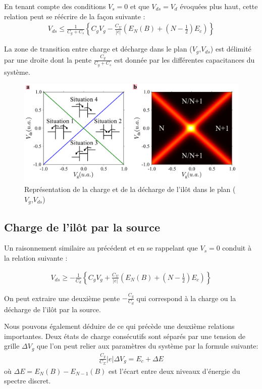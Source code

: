En tenant compte des conditions $V_s= 0$ et que $V_{ds} = V_d$ évoquées plus haut, cette relation peut se réécrire de la façon suivante :
\begin{eqnarray}
V_{ds} \leq \frac{1}{C_g + C_s} \left\lbrace C_gV_g - \frac{C_{\Sigma}}{|e|}\left(E_N(B) + (N-\frac{1}{2})E_c \right) \right\rbrace 
\end{eqnarray}

La zone de transition entre charge et décharge dans le plan ($V_g$,$V_{ds}$) est délimité par une droite dont la pente $\frac{C_g}{C_g + C_s}$ est donnée par les différentes capacitances du système.


\begin{figure}
\includegraphics[scale=0.5]{Theorie/Transport/figure3/figure3.pdf} 
\caption{Représentation de la charge et de la décharge de l'il\^ot dans le plan ($V_g$,$V_{ds}$)}
\label{charge_discharge}
\end{figure}



\subsection{Charge de l'il\^ot par la source}
Un raisonnement similaire au précédent et en se rappelant que $V_s = 0$ conduit à la relation suivante :

\begin{eqnarray}
V_{ds} \geq -\frac{1}{C_d} \left\lbrace C_gV_g + \frac{C_{\Sigma}}{|e|}\left( E_N(B) + (N-\frac{1}{2})E_c \right) \right\rbrace
\end{eqnarray}


On peut extraire une deuxième pente $-\frac{C_g}{C_d}$ qui correspond à la charge ou la décharge de l'il\^ot par la source.

Nous pouvons également déduire de ce qui précède une deuxième relations importantes. Deux états de charge consécutifs sont séparés par une tension de grille $\Delta V_g$ que l'on peut relier aux paramètres du système par la formule suivante:
\begin{eqnarray}
\frac{C_g}{C_{\Sigma}} |e| \Delta V_g = E_c + \Delta E
\end{eqnarray}
où $\Delta E = E_N(B) - E_{N-1}(B)$ est l'écart entre deux niveaux d'énergie du spectre discret.
